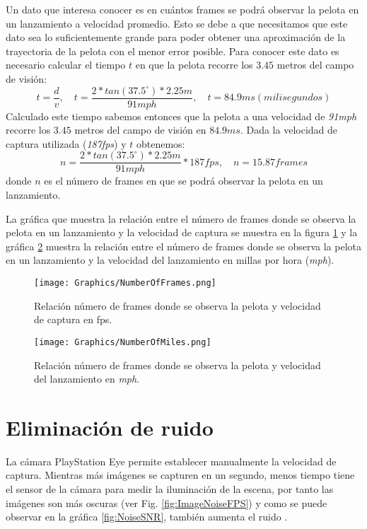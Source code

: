 Un dato que interesa conocer es en cuántos frames se podrá observar la pelota en un lanzamiento a velocidad promedio. Esto se debe a que necesitamos que este dato sea lo suficientemente grande para poder obtener una aproximación de la trayectoria de la pelota con el menor error posible. Para conocer este dato es necesario calcular el tiempo $t$ en que la pelota recorre los $3.45$ metros del campo de visión:
$$t = \frac{d}{v}, \quad t = \frac{2*tan(37.5^{\circ})*2.25m}{91mph}, \quad t = 84.9ms (milisegundos)$$
Calculado este tiempo sabemos entonces que la pelota a una velocidad de \textit{91mph} recorre los $3.45$ metros del campo de visión en $84.9ms$. Dada la velocidad de captura utilizada (\textit{187fps}) y $t$ obtenemos:
$$n=\frac{2*tan(37.5^{\circ})*2.25m}{91mph}*187fps, \quad n=15.87 frames$$
donde $n$ es el número de frames en que se podrá observar la pelota en un lanzamiento.

La gráfica que muestra la relación entre el número de frames donde se observa la pelota en un lanzamiento y la velocidad de captura se muestra en la figura \ref{fig:NumberOfFrames} y la gráfica \ref{fig:NumberOfMiles} muestra la relación entre el número de frames donde se observa la pelota en un lanzamiento y la velocidad del lanzamiento en millas por hora (\textit{mph}).

\begin{figure}[!h]
    \centering
    \texttt{[image: Graphics/NumberOfFrames.png]}
    \caption{Relación número de frames donde se observa la pelota y velocidad de captura en fps.}
    \label{fig:NumberOfFrames}
\end{figure}

\begin{figure}[!h]
    \centering
    \texttt{[image: Graphics/NumberOfMiles.png]}
    \caption{Relación número de frames donde se observa la pelota y velocidad del lanzamiento en \textit{mph}.}
    \label{fig:NumberOfMiles}
\end{figure}

\section{Eliminación de ruido}

La cámara PlayStation Eye permite establecer manualmente la velocidad de captura. Mientras más imágenes se capturen en un segundo, menos tiempo tiene el sensor de la cámara para medir la iluminación de la escena, por tanto las imágenes son más oscuras (ver Fig. \ref{fig:ImageNoiseFPS}) y como se puede observar en la gráfica \ref{fig:NoiseSNR}, también aumenta el ruido \cite{DVD}.

